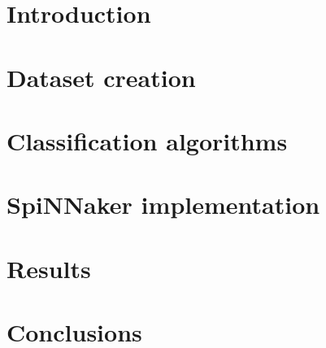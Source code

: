 \section{Introduction}
\section{Dataset creation}
\section{Classification algorithms}
\section{SpiNNaker implementation}
\section{Results}
\section{Conclusions}